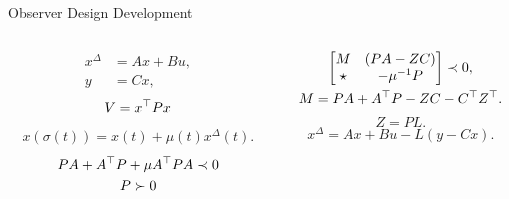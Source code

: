 \begin{slide}{Observer Design Development}
  \begin{columns}[c]
    \begin{column}{0.55\textwidth}
      \begin{align}
        x^{\Delta} & = Ax + Bu, \\
        y          & = Cx,
      \end{align}
      \begin{gather}
        V = x^{\top}{}Px
      \end{gather}
      \begin{gather}
        x(\sigma(t)) = x(t) + \mu(t)x^{\Delta}(t).
      \end{gather}
      \begin{gather}
        PA + A^{\top}{}P + \mu{}A^{\top}{}PA \prec{} 0 \\
        P \succ{} 0
      \end{gather}
    \end{column}%
    \hfill%
    \begin{column}{0.55\textwidth}
      \begin{gather}
        \begin{bmatrix}
          M     & (PA - ZC)  \\
          \star & -\mu^{-1}P
        \end{bmatrix} \prec{} 0,  \\
        M = PA + A^{\top}{}P - ZC - C^{\top}{}Z^{\top}{}.
      \end{gather}
      \begin{equation}
        Z = PL.
      \end{equation}
      \begin{equation}
        x^{\Delta} = Ax + Bu -L(y - Cx).
      \end{equation}
    \end{column}%
  \end{columns}
\end{slide}


